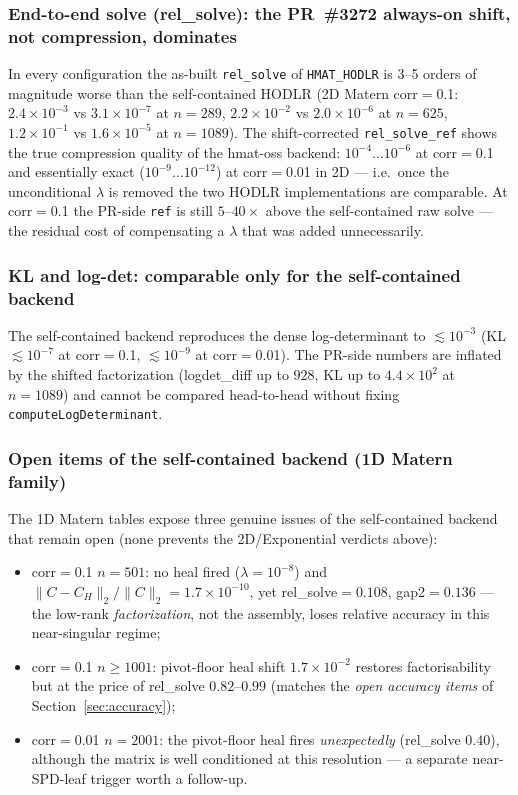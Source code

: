 \documentclass[11pt,a4paper]{article}
\begin{document}
\subsubsection*{End-to-end solve (rel\_solve): the PR~\#3272 always-on shift,
not compression, dominates}
In every configuration the as-built \texttt{rel\_solve} of \texttt{HMAT\_HODLR}
is 3--5 orders of magnitude worse than the self-contained HODLR (2D Matern
corr$=$0.1: $2.4\times10^{-3}$ vs $3.1\times10^{-7}$ at $n{=}289$,
$2.2\times10^{-2}$ vs $2.0\times10^{-6}$ at $n{=}625$, $1.2\times10^{-1}$ vs
$1.6\times10^{-5}$ at $n{=}1089$).  The shift-corrected \texttt{rel\_solve\_ref}
shows the true compression quality of the hmat-oss backend: $10^{-4}\dots
10^{-6}$ at corr$=$0.1 and essentially exact ($10^{-9}\dots 10^{-12}$) at
corr$=$0.01 in 2D --- i.e.\ once the unconditional $\lambda$ is removed the two
HODLR implementations are comparable.  At corr$=$0.1 the PR-side \texttt{ref}
is still $5$--$40\times$ above the self-contained raw solve --- the residual
cost of compensating a $\lambda$ that was added unnecessarily.
\subsubsection*{KL and log-det: comparable only for the self-contained backend}
The self-contained backend reproduces the dense log-determinant to
$\lesssim 10^{-3}$ (KL $\lesssim 10^{-7}$ at corr$=$0.1, $\lesssim 10^{-9}$ at
corr$=$0.01).  The PR-side numbers are inflated by the shifted factorization
(logdet\_diff up to $928$, KL up to $4.4\times10^{2}$ at $n{=}1089$) and cannot
be compared head-to-head without fixing \texttt{computeLogDeterminant}.
\subsubsection*{Open items of the self-contained backend (1D Matern family)}
The 1D Matern tables expose three genuine issues of the self-contained
backend that remain open (none prevents the 2D/Exponential verdicts above):
\begin{itemize}
\item corr$=$0.1 $n{=}501$: no heal fired ($\lambda{=}10^{-8}$) and
  $\|C-C_H\|_2/\|C\|_2{=}1.7\times10^{-10}$, yet rel\_solve$=0.108$,
  gap2$=0.136$ --- the low-rank \emph{factorization}, not the assembly,
  loses relative accuracy in this near-singular regime;
\item corr$=$0.1 $n\ge 1001$: pivot-floor heal shift $1.7\times10^{-2}$
  restores factorisability but at the price of rel\_solve $0.82$--$0.99$
  (matches the \emph{open accuracy items} of Section~\ref{sec:accuracy});
\item corr$=$0.01 $n{=}2001$: the pivot-floor heal fires \emph{unexpectedly}
  (rel\_solve $0.40$), although the matrix is well conditioned at this
  resolution --- a separate near-SPD-leaf trigger worth a follow-up.
\end{itemize}
\end{document}
